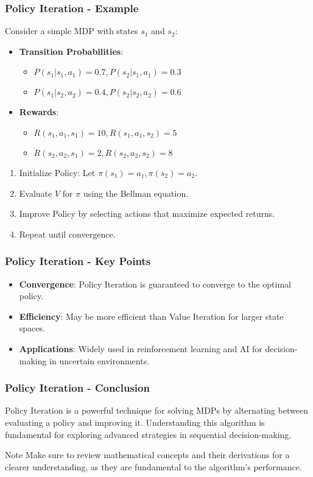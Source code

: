 \documentclass[aspectratio=169]{beamer}
\begin{document}
\begin{frame}[fragile]
    \frametitle{Policy Iteration - Example}
    Consider a simple MDP with states $s_1$ and $s_2$:
    \begin{itemize}
        \item \textbf{Transition Probabilities}:
            \begin{itemize}
                \item $P(s_1|s_1, a_1) = 0.7, P(s_2|s_1, a_1) = 0.3$
                \item $P(s_1|s_2, a_2) = 0.4, P(s_2|s_2, a_2) = 0.6$
            \end{itemize}
        
        \item \textbf{Rewards}:
            \begin{itemize}
                \item $R(s_1, a_1, s_1) = 10, R(s_1, a_1, s_2) = 5$
                \item $R(s_2, a_2, s_1) = 2, R(s_2, a_2, s_2) = 8$
            \end{itemize}
    \end{itemize}
    \begin{enumerate}
        \item Initialize Policy: Let $\pi(s_1) = a_1, \pi(s_2) = a_2$.
        \item Evaluate $V$ for $\pi$ using the Bellman equation.
        \item Improve Policy by selecting actions that maximize expected returns.
        \item Repeat until convergence.
    \end{enumerate}
\end{frame}

\begin{frame}[fragile]
    \frametitle{Policy Iteration - Key Points}
    \begin{itemize}
        \item \textbf{Convergence}: Policy Iteration is guaranteed to converge to the optimal policy.
        \item \textbf{Efficiency}: May be more efficient than Value Iteration for larger state spaces.
        \item \textbf{Applications}: Widely used in reinforcement learning and AI for decision-making in uncertain environments.
    \end{itemize}
\end{frame}

\begin{frame}[fragile]
    \frametitle{Policy Iteration - Conclusion}
    Policy Iteration is a powerful technique for solving MDPs by alternating between evaluating a policy and improving it. Understanding this algorithm is fundamental for exploring advanced strategies in sequential decision-making.
    
    \begin{block}{Note}
        Make sure to review mathematical concepts and their derivations for a clearer understanding, as they are fundamental to the algorithm's performance.
    \end{block}
\end{frame}
\end{document}
